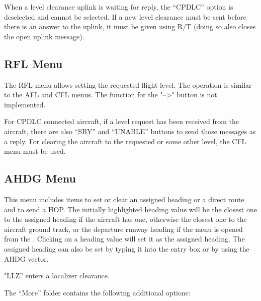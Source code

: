 \documentclass[a4paper,oneside,11pt]{memoir}
\begin{document}
\bigskip

When a level clearance uplink is waiting for reply, the “CPDLC” option is deselected and cannot be selected. If a new level clearance must be sent before there is an answer to the uplink, it must be given using R/T (doing so also closes the open uplink message).

\subsection{RFL Menu}
\label{menu:rfl}


The RFL menu allows setting the requested flight level. The operation is similar to the AFL and CFL menus. The function for the "-->" button is not implemented.

\bigskip


For CPDLC connected aircraft, if a level request has been received from the aircraft, there are also “SBY” and “UNABLE” buttons to send those messages as a reply. For clearing the aircraft to the requested or some other level, the CFL menu must be used.

\subsection{AHDG Menu}
\label{menu:ahdg}


This menu includes items to set or clear an assigned heading or a direct route and to send a HOP. The initially highlighted heading value will be the closest one to the assigned heading if the aircraft has one, otherwise the closest one to the aircraft ground track, or the departure runway heading if the menu is opened from the . Clicking on a heading value will set it as the assigned heading. The assigned heading can also be set by typing it into the entry box or by using the AHDG vector.

\bigskip

"LLZ” enters a localizer clearance.

\bigskip

The “More” folder contains the following additional options:
\end{document}

